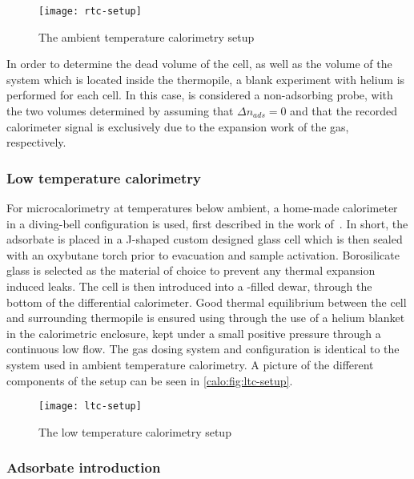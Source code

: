 \begin{figure}[htb]
    \centering
    \texttt{[image: rtc-setup]}%
    \caption{The ambient temperature calorimetry setup}%
    \label{calo:fig:rtc-setup}
\end{figure}

In order to determine the dead volume of the cell, as well 
as the volume of the system which is located inside the thermopile,
a blank experiment with helium is performed for each cell.
In this case,  is considered a non-adsorbing probe, with the 
two volumes determined by assuming that \(\Delta n_{ads} = 0\)
and that the recorded calorimeter signal
is exclusively due to the expansion work of the gas, respectively.

\subsubsection{Low temperature calorimetry}\label{calo:ltc}

For microcalorimetry at temperatures below ambient, a home-made calorimeter
in a diving-bell configuration is used, first described in the work 
of~\citet{rouquerolCalorimetricEvidenceBidimensional1977}. In short,
the adsorbate is placed in a J-shaped custom designed glass cell which is
then sealed with an oxybutane torch prior to evacuation and sample 
activation. Borosilicate glass is selected as
the material of choice to prevent any thermal expansion induced leaks.
The cell is then introduced into a -filled dewar, through 
the bottom of the differential calorimeter. Good thermal equilibrium
between the cell and surrounding thermopile is ensured using through 
the use of a helium blanket in the calorimetric enclosure, kept under a
small positive pressure through a continuous low flow. The gas dosing 
system and configuration is identical to the system used in ambient
temperature calorimetry. A picture of the different components of the 
setup can be seen in \autoref{calo:fig:ltc-setup}.

\begin{figure}[htb]
    \centering
    \texttt{[image: ltc-setup]}%
    \caption{The low temperature calorimetry setup}%
    \label{calo:fig:ltc-setup}
\end{figure}

\subsubsection{Adsorbate introduction}\label{calo:ads-intro}

